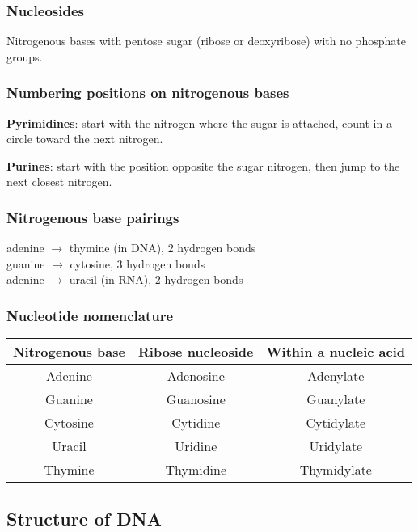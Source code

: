 \documentclass[letterpaper, 12pt]{article}
\begin{document}
\subsubsection*{Nucleosides}
Nitrogenous bases with pentose sugar (ribose or deoxyribose) with no phosphate groups.

\subsubsection*{Numbering positions on nitrogenous bases}
\textbf{Pyrimidines}: start with the nitrogen where the sugar is attached, count in a circle toward the next nitrogen.

\textbf{Purines}: start with the position opposite the sugar nitrogen, then jump to the next closest nitrogen.

\subsubsection*{Nitrogenous base pairings}
adenine $\to$ thymine (in DNA), 2 hydrogen bonds \\
guanine $\to$ cytosine, 3 hydrogen bonds \\
adenine $\to$ uracil (in RNA), 2 hydrogen bonds

\subsubsection*{Nucleotide nomenclature}

\begin{table}[H]
\begin{tabular}{|c|c|c|}
\hline
\textbf{Nitrogenous base} & \textbf{Ribose nucleoside} & \textbf{Within a nucleic acid} \\\hline
Adenine & Adenosine & Adenylate \\\hline
Guanine & Guanosine & Guanylate \\\hline
Cytosine & Cytidine & Cytidylate \\\hline
Uracil & Uridine & Uridylate \\\hline
Thymine & Thymidine & Thymidylate \\\hline
\end{tabular}
\end{table}

\subsection*{Structure of DNA}
\end{document}
